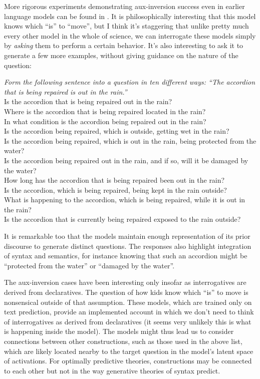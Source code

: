 \documentclass[output=paper,colorlinks,citecolor=brown]{langscibook}
\begin{document}
\noindent More rigorous experiments demonstrating aux-inversion success even in earlier language models can be found in . It is philosophically interesting that this model knows which ``is'' to ``move'', but I think it's staggering that unlike pretty much every other model in the whole of science, we can interrogate these models simply by \textit{asking} them to perform a certain behavior. It's also interesting to ask it to generate a few more examples, without giving guidance on the nature of the question:

\begin{myquote}
\textit{Form the following sentence into a question in ten different ways: ``The accordion that is being repaired is out in the rain.''}\medskip\\
\noindent Is the accordion that is being repaired out in the rain?\\
Where is the accordion that is being repaired located in the rain?\\
In what condition is the accordion being repaired out in the rain?\\
Is the accordion being repaired, which is outside, getting wet in the rain?\\
Is the accordion being repaired, which is out in the rain, being protected from the water?\\
Is the accordion being repaired out in the rain, and if so, will it be damaged by the water?\\
How long has the accordion that is being repaired been out in the rain?\\
Is the accordion, which is being repaired, being kept in the rain outside?\\
What is happening to the accordion, which is being repaired, while it is out in the rain?\\
Is the accordion that is currently being repaired exposed to the rain outside?
\end{myquote}

\noindent It is remarkable too that the models maintain enough representation of its prior discourse to generate distinct questions. The responses also highlight integration of syntax and semantics, for instance knowing that such an accordion might be ``protected from the water'' or ``damaged by the water''. 

The aux-inversion cases have been interesting only insofar as interrogatives are derived from declaratives. The question of how kids know which ``is'' to move is nonsensical outside of that assumption. These models, which are trained only on text prediction, provide an implemented account in which we don't need to think of interrogatives as derived from declaratives (it seems very unlikely this is what is happening inside the model). The models might thus lead us to consider connections between other constructions, such as those used in the above list, which are likely located nearby to the target question in the model's latent space of activations. For optimally predictive theories, constructions may be connected to each other but not in the way generative theories of syntax predict.
   
\end{document}
